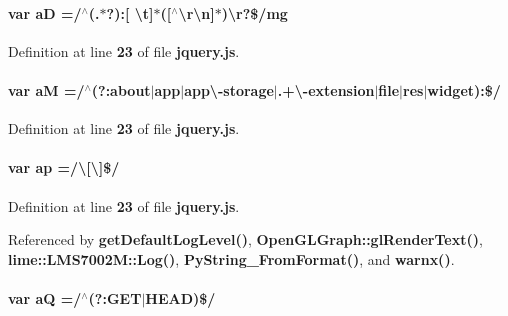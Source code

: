 \paragraph[{aD}]{\setlength{\rightskip}{0pt plus 5cm}var aD =/$^\wedge$(.$\ast$?)\+:[ \textbackslash{}t]$\ast$([$^\wedge$\textbackslash{}r\textbackslash{}n]$\ast$)\textbackslash{}r?\$/mg}\label{soapysdr_2build_2docs_2html_2jquery_8js_ad223f5fba68c41c1236671ac5c5b0fcb}


Definition at line {\bf 23} of file {\bf jquery.\+js}.

\paragraph[{aM}]{\setlength{\rightskip}{0pt plus 5cm}var aM =/$^\wedge$(?\+:about$\vert$app$\vert$app\textbackslash{}-\/storage$\vert$.+\textbackslash{}-\/extension$\vert${\bf file}$\vert$res$\vert$widget)\+:\$/}\label{soapysdr_2build_2docs_2html_2jquery_8js_a8cc6111a5def3ea889157d13fb9a9672}


Definition at line {\bf 23} of file {\bf jquery.\+js}.

\paragraph[{ap}]{\setlength{\rightskip}{0pt plus 5cm}var ap =/\textbackslash{}[\textbackslash{}]\$/}\label{soapysdr_2build_2docs_2html_2jquery_8js_a6ddf393cc7f9a8828e197bb0d9916c44}


Definition at line {\bf 23} of file {\bf jquery.\+js}.



Referenced by {\bf get\+Default\+Log\+Level()}, {\bf Open\+G\+L\+Graph\+::gl\+Render\+Text()}, {\bf lime\+::\+L\+M\+S7002\+M\+::\+Log()}, {\bf Py\+String\+\_\+\+From\+Format()}, and {\bf warnx()}.

\paragraph[{aQ}]{\setlength{\rightskip}{0pt plus 5cm}var aQ =/$^\wedge$(?\+:G\+ET$\vert$H\+E\+AD)\$/}\label{soapysdr_2build_2docs_2html_2jquery_8js_a79eb58dc6cdf0aef563d5dc1ded27df5}


